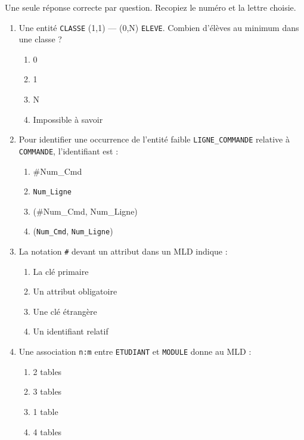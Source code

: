 \documentclass[11pt]{article}
\begin{document}
\begin{exercice}
Une seule réponse correcte par question. Recopiez le numéro et la lettre choisie.
\begin{enumerate}
    \item Une entité \texttt{CLASSE} (1,1) — (0,N) \texttt{ELEVE}. Combien d'élèves au minimum dans une classe ?
    \begin{enumerate}
        \item 0 \item 1 \item N \item Impossible à savoir
    \end{enumerate}
    \item Pour identifier une occurrence de l'entité faible \texttt{LIGNE\_COMMANDE} relative à \texttt{COMMANDE}, l'identifiant est :
    \begin{enumerate}
        \item \#Num\_Cmd \item \texttt{Num\_Ligne} \item (\#Num\_Cmd, Num\_Ligne) \item (\texttt{Num\_Cmd}, \texttt{Num\_Ligne})
    \end{enumerate}
    \item La notation \texttt{\#} devant un attribut dans un MLD indique :
    \begin{enumerate}
        \item La clé primaire \item Un attribut obligatoire \item Une clé étrangère \item Un identifiant relatif
    \end{enumerate}
    \item Une association \texttt{n:m} entre \texttt{ETUDIANT} et \texttt{MODULE} donne au MLD :
    \begin{enumerate}
        \item 2 tables \item 3 tables \item 1 table \item 4 tables
    \end{enumerate}
\end{enumerate}
\end{exercice}
\end{document}
